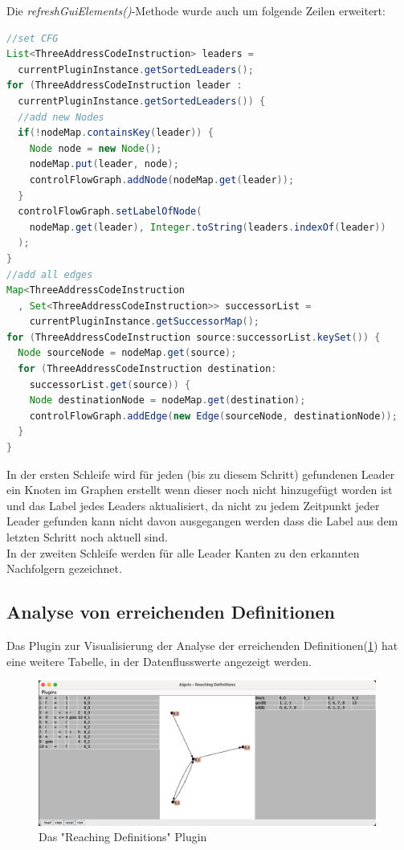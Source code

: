 \newpage
Die \textit{refreshGuiElements()}-Methode wurde auch um folgende Zeilen erweitert:
\begin{lstlisting}[language=Java, caption={Aktualisieren der Tabelle}, label={cde:refresh2}]
//set CFG
List<ThreeAddressCodeInstruction> leaders = 
  currentPluginInstance.getSortedLeaders();
for (ThreeAddressCodeInstruction leader : 
  currentPluginInstance.getSortedLeaders()) {
  //add new Nodes
  if(!nodeMap.containsKey(leader)) {
    Node node = new Node();
    nodeMap.put(leader, node);
    controlFlowGraph.addNode(nodeMap.get(leader));
  }
  controlFlowGraph.setLabelOfNode(
    nodeMap.get(leader), Integer.toString(leaders.indexOf(leader))
  );
}
//add all edges
Map<ThreeAddressCodeInstruction
  , Set<ThreeAddressCodeInstruction>> successorList = 
    currentPluginInstance.getSuccessorMap();
for (ThreeAddressCodeInstruction source:successorList.keySet()) {
  Node sourceNode = nodeMap.get(source);
  for (ThreeAddressCodeInstruction destination:
    successorList.get(source)) {
    Node destinationNode = nodeMap.get(destination);
    controlFlowGraph.addEdge(new Edge(sourceNode, destinationNode));
  }
}
\end{lstlisting}
In der ersten Schleife wird für jeden (bis zu diesem Schritt) 
gefundenen Leader ein Knoten im Graphen erstellt wenn dieser 
noch nicht hinzugefügt worden ist und das Label jedes Leaders aktualisiert,
da nicht zu jedem Zeitpunkt jeder Leader gefunden kann nicht davon ausgegangen werden
dass die Label aus dem letzten Schritt noch aktuell sind.\\
In der zweiten Schleife werden für alle Leader Kanten zu den erkannten Nachfolgern gezeichnet.



\newpage
\subsection{Analyse von erreichenden Definitionen}
Das Plugin zur Visualisierung der Analyse der erreichenden Definitionen(\cref{fig:reachingDefinitions})
hat eine weitere Tabelle, in der Datenflusswerte angezeigt werden.
\begin{figure}[h]
  \centering
  \includegraphics[width=0.99\textwidth]{fig/Screenshot_ReachingDefinitions.png}
  \caption{Das "Reaching Definitions" Plugin}
  \label{fig:reachingDefinitions}
\end{figure}

